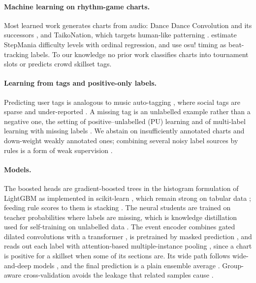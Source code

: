 \documentclass[10pt,twocolumn]{article}
\begin{document}
\paragraph{Machine learning on rhythm-game charts.} Most learned work generates charts from audio: Dance Dance Convolution \citep{donahue2017ddc} and its successors \citep{yi2023beataligned,an2026transfer}, and TaikoNation, which targets human-like patterning \citep{halina2021taikonation}. \citet{franks2023ordinal} estimate StepMania difficulty levels with ordinal regression, and \citet{liu2025osu2mir} use osu! timing as beat-tracking labels. To our knowledge no prior work classifies charts into tournament slots or predicts crowd skillset tags.

\paragraph{Learning from tags and positive-only labels.} Predicting user tags is analogous to music auto-tagging \citep{lamere2008social,choi2016autotagging}, where social tags are sparse and under-reported \citep{golder2006usage}. A missing tag is an unlabelled example rather than a negative one, the setting of positive--unlabelled (PU) learning \citep{elkan2008pu,bekker2020pu} and of multi-label learning with missing labels \citep{yu2014missing}. We abstain on insufficiently annotated charts and down-weight weakly annotated ones; combining several noisy label sources by rules is a form of weak supervision \citep{ratner2017snorkel}.

\paragraph{Models.} The boosted heads are gradient-boosted trees \citep{friedman2001gbm} in the histogram formulation of LightGBM \citep{ke2017lightgbm} as implemented in scikit-learn \citep{pedregosa2011sklearn}, which remain strong on tabular data \citep{grinsztajn2022tree}; feeding rule scores to them is stacking \citep{wolpert1992stacked}. The neural students are trained on teacher probabilities where labels are missing, which is knowledge distillation \citep{hinton2015distilling} used for self-training on unlabelled data \citep{xie2020noisy}. The event encoder combines gated \citep{dauphin2017glu} dilated \citep{oord2016wavenet} convolutions with a transformer \citep{vaswani2017attention}, is pretrained by masked prediction \citep{devlin2019bert}, and reads out each label with attention-based multiple-instance pooling \citep{dietterich1997mil,ilse2018attention}, since a chart is positive for a skillset when some of its sections are. Its wide path follows wide-and-deep models \citep{cheng2016wide}, and the final prediction is a plain ensemble average \citep{dietterich2000ensemble}. Group-aware cross-validation avoids the leakage that related samples cause \citep{kaufman2012leakage,roberts2017cv}.
\end{document}
